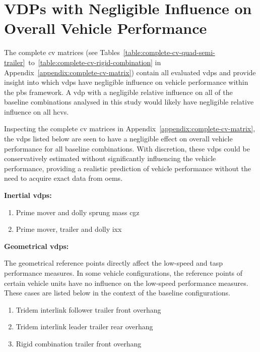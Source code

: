 \section{VDPs with Negligible Influence on Overall Vehicle Performance}\label{section:vdps-with-negligible-influence-on-overall-performance}

The complete \gls{cv} matrices (see Tables~\ref{table:complete-cv-quad-semi-trailer}~to~\ref{table:complete-cv-rigid-combination} in Appendix~\ref{appendix:complete-cv-matrix}) contain all evaluated \glspl{vdp} and provide insight into which \glspl{vdp} have negligible influence on vehicle performance within the \gls{pbs} framework. A \gls{vdp} with a negligible relative influence on all of the baseline combinations analysed in this study would likely have negligible relative influence on all \glspl{hcv}. 

Inspecting the complete \gls{cv} matrices in Appendix~\ref{appendix:complete-cv-matrix}, the \glspl{vdp} listed below are seen to have a negligible effect on overall vehicle performance for all baseline combinations. With discretion, these \glspl{vdp} could be conservatively estimated without significantly influencing the vehicle performance, providing a realistic prediction of vehicle performance without the need to acquire exact data from \glspl{oem}.

\textbf{Inertial \glspl{vdp}:}
\begin{enumerate}
	\item Prime mover and dolly sprung mass \gls{cgz}
	\item Prime mover, trailer and dolly \gls{ixx}
\end{enumerate}

\textbf{Geometrical \glspl{vdp}:}

The geometrical reference points directly affect the low-speed and \gls{tasp} performance measures. In some vehicle configurations, the reference points of certain vehicle units have no influence on the low-speed performance measures. These cases are listed below in the context of the baseline configurations.

\begin{enumerate}
	\item Tridem interlink follower trailer front overhang
	\item Tridem interlink leader trailer rear overhang
	\item Rigid combination trailer front overhang
\end{enumerate}

